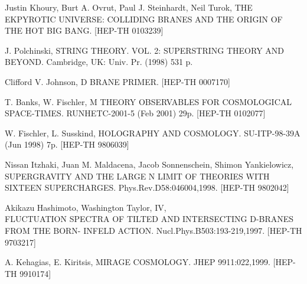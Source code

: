 \documentclass[a4paper,12pt]{article}
\begin{document}
\pagebreak

\begin{thebibliography}{99}

    Justin Khoury, Burt A. Ovrut, Paul J. Steinhardt, Neil
    Turok, THE EKPYROTIC UNIVERSE: COLLIDING BRANES AND THE
    ORIGIN OF THE HOT BIG BANG.
    [HEP-TH 0103239]

    J. Polchinski, STRING THEORY. VOL. 2: SUPERSTRING THEORY
    AND BEYOND.
    Cambridge, UK: Univ. Pr. (1998) 531 p.

    Clifford V. Johnson, D BRANE PRIMER.
    [HEP-TH 0007170]

    T. Banks, W. Fischler, M THEORY OBSERVABLES FOR
    COSMOLOGICAL SPACE-TIMES. RUNHETC-2001-5 (Feb 2001) 29p.
    [HEP-TH 0102077]

    W. Fischler, L. Susskind, HOLOGRAPHY AND COSMOLOGY.
    SU-ITP-98-39A (Jun 1998) 7p.
    [HEP-TH 9806039]

    Nissan Itzhaki, Juan M. Maldacena, Jacob Sonnenschein,
    Shimon Yankielowicz, SUPERGRAVITY AND THE LARGE N LIMIT OF
    THEORIES WITH SIXTEEN SUPERCHARGES.
    Phys.Rev.D58:046004,1998.
    [HEP-TH 9802042]

    Akikazu Hashimoto, Washington Taylor, IV, \\
    FLUCTUATION SPECTRA OF TILTED AND INTERSECTING D-BRANES FROM THE BORN-
    INFELD ACTION.
    Nucl.Phys.B503:193-219,1997.
    [HEP-TH 9703217]

    A. Kehagias, E. Kiritsis, MIRAGE COSMOLOGY.
    JHEP 9911:022,1999.
    [HEP-TH 9910174]

\end{thebibliography}
\end{document}
